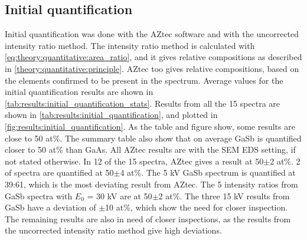 \subsection{Initial quantification}
\label{results:initial_quantification}

Initial quantification was done with the AZtec software and with the uncorrected intensity ratio method.
The intensity ratio method is calculated with \cref{eq:theory:quantitative:area_ratio}, and it gives relative compositions as described in \cref{theory:quantitative:principle}.
AZtec too gives relative compositions, based on the elements confirmed to be present in the spectrum.
Average values for the initial quantification results are shown in \cref{tab:results:initial_quantification_stats}.
Results from all the 15 spectra are shown in \cref{tab:results:initial_quantification}, and plotted in \cref{fig:results:initial_quantification}.
As the table and figure show, some results are close to 50 at\%.
The summary table also show that on average GaSb is quantified closer to 50 at\% than GaAs.
All AZtec results are with the SEM EDS setting, if not stated otherwise.
In 12 of the 15 spectra, AZtec gives a result at 50$\pm$2 at\%.
2 of spectra are quantified at 50$\pm$4 at\%.
The 5 kV GaSb spectrum is quantified at 39:61, which is the most deviating result from AZtec.
The 5 intensity ratios from GaSb spectra with $E_0$ = 30 kV are at 50$\pm$2 at\%.
The three 15 kV results from GaSb have a deviation of $\pm$10 at\%, which show the need for closer inspection.
The remaining results are also in need of closer inspections, as the results from the uncorrected intensity ratio method give high deviations.


